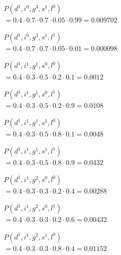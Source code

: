 $\begin{array}{l}
    P(d^1, i^0, g^3, s^1, l^0) \\
    = 0.4 \cdot 0.7 \cdot 0.7 \cdot 0.05 \cdot 0.99 = 0.009702
\end{array}$

$\begin{array}{l}
    P(d^1, i^0, g^3, s^1, l^1) \\
    = 0.4 \cdot 0.7 \cdot 0.7 \cdot 0.05 \cdot 0.01 = 0.000098
\end{array}$


$\begin{array}{l}
    P(d^1, i^1, g^1, s^0, l^0) \\
    = 0.4 \cdot 0.3 \cdot 0.5 \cdot 0.2 \cdot 0.1 = 0.0012
\end{array}$

$\begin{array}{l}
    P(d^1, i^1, g^1, s^0, l^1) \\
    = 0.4 \cdot 0.3 \cdot 0.5 \cdot 0.2 \cdot 0.9 = 0.0108
\end{array}$

$\begin{array}{l}
    P(d^1, i^1, g^1, s^1, l^0) \\
    = 0.4 \cdot 0.3 \cdot 0.5 \cdot 0.8 \cdot 0.1 = 0.0048
\end{array}$

$\begin{array}{l}
    P(d^1, i^1, g^1, s^1, l^1) \\
    = 0.4 \cdot 0.3 \cdot 0.5 \cdot 0.8 \cdot 0.9 = 0.0432
\end{array}$

$\begin{array}{l}
    P(d^1, i^1, g^2, s^0, l^0) \\
    = 0.4 \cdot 0.3 \cdot 0.3 \cdot 0.2 \cdot 0.4 = 0.00288
\end{array}$

$\begin{array}{l}
    P(d^1, i^1, g^2, s^0, l^1) \\
    = 0.4 \cdot 0.3 \cdot 0.3 \cdot 0.2 \cdot 0.6 = 0.00432
\end{array}$

$\begin{array}{l}
    P(d^1, i^1, g^2, s^1, l^0) \\
    = 0.4 \cdot 0.3 \cdot 0.3 \cdot 0.8 \cdot 0.4 = 0.01152
\end{array}$

